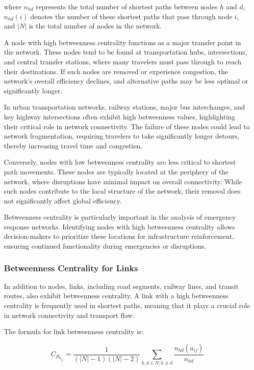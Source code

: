where \( n_{hd} \) represents the total number of shortest paths between nodes \( h \) and \( d \), \( n_{hd}(i) \) denotes the number of these shortest paths that pass through node \( i \), and \( |N| \) is the total number of nodes in the network.

A node with high betweenness centrality functions as a major transfer point in the network. These nodes tend to be found at transportation hubs, intersections, and central transfer stations, where many travelers must pass through to reach their destinations. If such nodes are removed or experience congestion, the network’s overall efficiency declines, and alternative paths may be less optimal or significantly longer.

In urban transportation networks, railway stations, major bus interchanges, and key highway intersections often exhibit high betweenness values, highlighting their critical role in network connectivity. The failure of these nodes could lead to network fragmentation, requiring travelers to take significantly longer detours, thereby increasing travel time and congestion.

Conversely, nodes with low betweenness centrality are less critical to shortest path movements. These nodes are typically located at the periphery of the network, where disruptions have minimal impact on overall connectivity. While such nodes contribute to the local structure of the network, their removal does not significantly affect global efficiency.

Betweenness centrality is particularly important in the analysis of emergency response networks. Identifying nodes with high betweenness centrality allows decision-makers to prioritize these locations for infrastructure reinforcement, ensuring continued functionality during emergencies or disruptions.

\subsubsection{Betweenness Centrality for Links}
In addition to nodes, links, including road segments, railway lines, and transit routes, also exhibit betweenness centrality. A link with a high betweenness centrality is frequently used in shortest paths, meaning that it plays a crucial role in network connectivity and transport flow.

The formula for link betweenness centrality is:

\begin{equation}
C_{B_{a_{ij}}} = \frac{1}{(|N| - 1) (|N| - 2)} \sum_{h,d \in N; h \neq d} \frac{n_{hd}(a_{ij})}{n_{hd}}
\end{equation}

